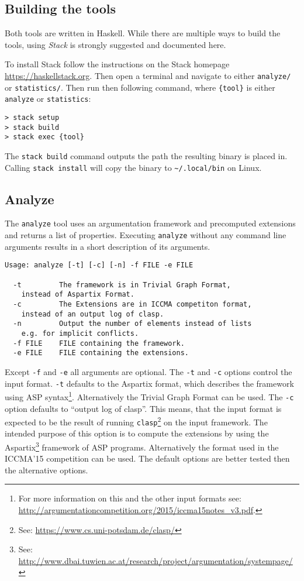 \documentclass{scrartcl}
\begin{document}
\subsection{Building the tools}

Both tools are written in Haskell. While there are multiple ways to build the
tools, using \emph{Stack} is strongly suggested and documented here.

To install Stack follow the instructions on the Stack homepage
\url{https://haskellstack.org}. Then open a terminal and navigate to either
\texttt{analyze/} or \texttt{statistics/}. Then run then following command,
where \texttt{\{tool\}} is either \texttt{analyze} or \texttt{statistics}:

\begin{verbatim}
> stack setup
> stack build
> stack exec {tool}
\end{verbatim}

The \texttt{stack build} command outputs the path the resulting binary
is placed in. Calling \texttt{stack install} will copy the binary
to \texttt{\~{}/.local/bin} on Linux.

\subsection{Analyze}

The \texttt{analyze} tool uses an argumentation framework and precomputed
extensions and returns a list of properties. Executing \texttt{analyze}
without any command line arguments results in a short description of
its arguments.

\begin{verbatim}
Usage: analyze [-t] [-c] [-n] -f FILE -e FILE

  -t         The framework is in Trivial Graph Format,
    instead of Aspartix Format.
  -c         The Extensions are in ICCMA competiton format,
    instead of an output log of clasp.
  -n         Output the number of elements instead of lists
    e.g. for implicit conflicts.
  -f FILE    FILE containing the framework.
  -e FILE    FILE containing the extensions.
\end{verbatim}

Except \texttt{-f} and \texttt{-e} all arguments are optional.  The \texttt{-t}
and \texttt{-c} options control the input format. \texttt{-t} defaults to the
Aspartix format, which describes the framework using ASP syntax\footnote{For
    more information on this and the other input formats see:
\url{http://argumentationcompetition.org/2015/iccma15notes_v3.pdf}.}.
Alternatively the Trivial Graph Format can be used. The \texttt{-c} option
defaults to ``output log of clasp''. This means, that the input format is
expected to be the result of running \texttt{clasp}\footnote{See:
\url{https://www.cs.uni-potsdam.de/clasp/}} on the input framework. The intended
purpose of this option is to compute the extensions by using the
Aspartix\footnote{See:
\url{http://www.dbai.tuwien.ac.at/research/project/argumentation/systempage/}}
framework of ASP programs. Alternatively the format used in the ICCMA'15
competition can be used. The default options are better tested then the
alternative options.
\end{document}
